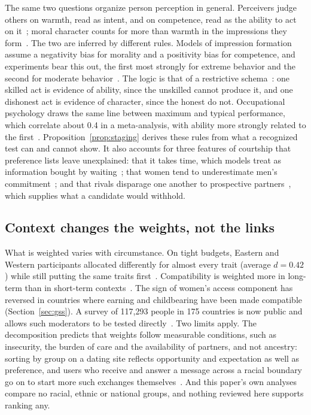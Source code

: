 The same two questions organize person perception in general. Perceivers judge others on warmth, read as intent, and on
competence, read as the ability to act on it~\cite{fiske2007}; moral character counts for more than warmth in the
impressions they form~\cite{goodwin2014}. The two are inferred by different rules. Models of impression formation assume a
negativity bias for morality and a positivity bias for competence, and experiments bear this out, the first most strongly
for extreme behavior and the second for moderate behavior~\cite{wojciszke1993,skowronski1987}. The logic is that of a
restrictive schema~\cite{reeder1979}: one skilled act is evidence of ability, since the unskilled cannot produce it, and
one dishonest act is evidence of character, since the honest do not. Occupational
psychology draws the same line between maximum and typical performance, which correlate about 0.4 in a meta-analysis, with
ability more strongly related to the first~\cite{beus2012,sackett1988}. Proposition~\ref{prop:staging} derives these rules
from what a recognized test can and cannot show. It also accounts for three features of courtship that preference lists
leave unexplained: that it takes time, which models treat as information bought by waiting~\cite{wachtmeister1999,seymour2009};
that women tend to underestimate men's commitment~\cite{haselton2000}; and that rivals disparage one another to prospective
partners~\cite{buss1990}, which supplies what a candidate would withhold.

\subsection{Context changes the weights, not the links}

What is weighted varies with circumstance. On tight budgets, Eastern and Western participants allocated differently for
almost every trait (average $d=0.42$) while still putting the same traits first~\cite{thomas2020}. Compatibility is weighted
more in long-term than in short-term contexts~\cite{jonason2026}. The sign of women's access component has reversed in
countries where earning and childbearing have been made compatible (Section~\ref{sec:gss}). A survey of 117,293 people in 175
countries is now public and allows such moderators to be tested directly~\cite{kowal2025}. Two limits apply. The decomposition
predicts that weights follow measurable conditions, such as insecurity, the burden of care and the availability of partners,
and not ancestry: sorting by group on a dating site reflects opportunity and expectation as well as preference, and users
who receive and answer a message across a racial boundary go on to start more such exchanges themselves~\cite{lewis2013}. And
this paper's own analyses compare no racial, ethnic or national groups, and nothing reviewed here supports ranking any.

